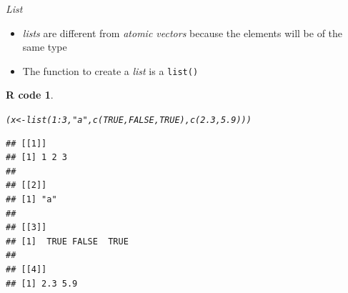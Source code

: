 \documentclass[11pt]{beamer}\usepackage[]{graphicx}\usepackage[]{color}
\makeatletter
\newcommand{\hlnum}[1]{\textcolor[rgb]{0.063,0.58,0.627}{#1}}%
\newcommand{\hlstr}[1]{\textcolor[rgb]{0.063,0.58,0.627}{#1}}%
\newcommand{\hlopt}[1]{\textcolor[rgb]{0.196,0.196,0.196}{#1}}%
\newcommand{\hlstd}[1]{\textcolor[rgb]{0.196,0.196,0.196}{#1}}%
\newcommand{\hlkwb}[1]{\textcolor[rgb]{0.627,0,0.314}{#1}}%
\newcommand{\hlkwd}[1]{\textcolor[rgb]{0.78,0.227,0.412}{#1}}%
\newenvironment{kframe}{%
 \def\at@end@of@kframe{}%
 \ifinner\ifhmode%
  \def\at@end@of@kframe{\end{minipage}}%
  \begin{minipage}{\columnwidth}%
 \fi\fi%
 \def\FrameCommand##1{\hskip\@totalleftmargin \hskip-\fboxsep
 \colorbox{shadecolor}{##1}\hskip-\fboxsep
     \hskip-\linewidth \hskip-\@totalleftmargin \hskip\columnwidth}%
 \MakeFramed {\advance\hsize-\width
   \@totalleftmargin\z@ \linewidth\hsize
   \@setminipage}}%
 {\par\unskip\endMakeFramed%
 \at@end@of@kframe}
\newenvironment{knitrout}{}{} %
\newtheorem{rcode}{R code}[section]
\newcommand{\code}[1]{\texttt{#1}}
\makeatother
\begin{document}
\begin{frame}[fragile]{\textit{List}}

\begin{itemize}
\item \textit{lists} are different from \textit{atomic vectors} because the elements will be of the same type
\item The function to create a \textit{list} is a \code{list()}
\end{itemize}
\pause
\begin{knitrout}\footnotesize
{}\color{fgcolor}\begin{kframe}
\begin{rcode}\label{unnamed-chunk-18}\begin{alltt}
\hlstd{(x} \hlkwb{<-} \hlkwd{list}\hlstd{(}\hlnum{1}\hlopt{:}\hlnum{3}\hlstd{,} \hlstr{"a"}\hlstd{,} \hlkwd{c}\hlstd{(}\hlnum{TRUE}\hlstd{,} \hlnum{FALSE}\hlstd{,} \hlnum{TRUE}\hlstd{),} \hlkwd{c}\hlstd{(}\hlnum{2.3}\hlstd{,} \hlnum{5.9}\hlstd{)))}
\end{alltt}
\begin{verbatim}
## [[1]]
## [1] 1 2 3
## 
## [[2]]
## [1] "a"
## 
## [[3]]
## [1]  TRUE FALSE  TRUE
## 
## [[4]]
## [1] 2.3 5.9
\end{verbatim}
\end{rcode}\end{kframe}
\end{knitrout}

\end{frame}

\end{document}
